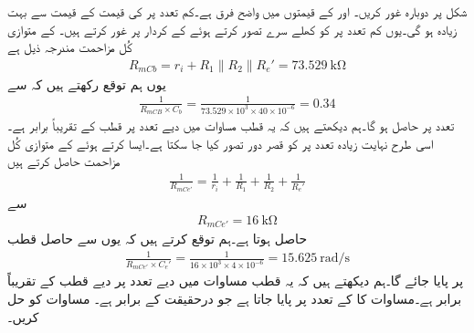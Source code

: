 شکل  پر دوبارہ غور کریں۔ اور  کے قیمتوں میں واضح فرق ہے۔کم تعدد پر  کی قیمت  کے قیمت سے بہت زیادہ ہو گی۔یوں کم تعدد پر  کو کھلے سرے تصور کرتے ہوئے  کے کردار پر غور کرتے ہیں۔ کے متوازی کُل مزاحمت  مندرجہ ذیل ہے
\begin{align*}
R_{mCb}=r_i+ R_1 \mathbin{\|} R_2 \mathbin{\|} R_e'=\SI{73.529}{\kilo \ohm}
\end{align*}
یوں ہم توقع رکھتے ہیں کہ  سے
\begin{align*}
\frac{1}{R_{mCB} \times C_b}=\frac{1}{73.529 \times 10^3 \times 40 \times 10^{-6}}=\num{0.34}
\end{align*}
تعدد پر  حاصل ہو گا۔ہم دیکھتے ہیں کہ یہ قطب مساوات  میں دیے  تعدد پر قطب کے تقریباً برابر ہے۔اسی طرح نہایت زیادہ تعدد پر  کو قصر دور تصور کیا جا سکتا ہے۔ایسا کرتے ہوئے  کے متوازی کُل مزاحمت حاصل کرتے ہیں
\begin{align*}
\frac{1}{R_{mCe'}}=\frac{1}{r_i}+\frac{1}{R_1}+\frac{1}{R_2}+\frac{1}{R_e'}
\end{align*}
سے
\begin{align*}
R_{mCe'}=\SI{16}{\kilo \ohm}
\end{align*}
حاصل ہوتا ہے۔ہم توقع کرتے ہیں کہ یوں  سے حاصل قطب
\begin{align*}
\frac{1}{R_{mCe'} \times C_e'}=\frac{1}{16 \times 10^{3} \times 4 \times 10^{-6}}=\SI{15.625}{\radian \per \second}
\end{align*}
پر پایا جائے گا۔ہم دیکھتے ہیں کہ یہ قطب مساوات  میں دیے  تعدد پر دیے قطب کے  تقریباً برابر ہے۔مساوات کا    کے تعدد پر پایا جاتا ہے جو درحقیقت  کے برابر ہے۔
مساوات  کو حل کریں۔

